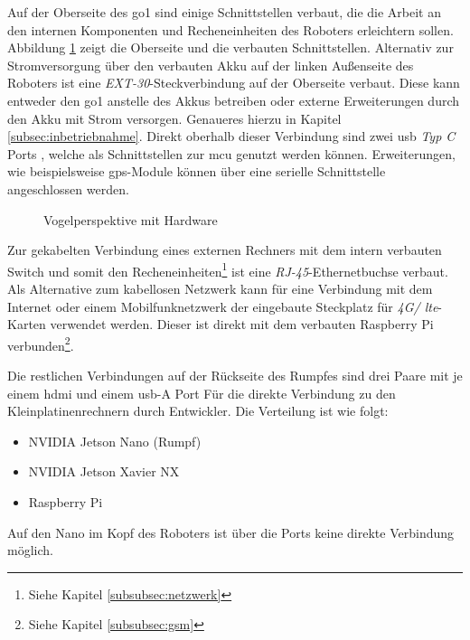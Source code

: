 Auf der Oberseite des \gls{go1} sind einige Schnittstellen verbaut, die die Arbeit an den internen Komponenten und
Recheneinheiten des Roboters erleichtern sollen.
Abbildung \ref{fig:vogelperspektive} zeigt die Oberseite und die verbauten Schnittstellen.
Alternativ zur Stromversorgung über den verbauten Akku  auf der linken Außenseite des Roboters ist eine
\emph{EXT-30}-Steckverbindung  auf der Oberseite verbaut.
Diese kann entweder den \gls{go1} anstelle des Akkus betreiben oder externe Erweiterungen durch den Akku mit Strom versorgen.
Genaueres hierzu in Kapitel \ref{subsec:inbetriebnahme}.
Direkt oberhalb dieser Verbindung sind zwei \gls{usb} \emph{Typ C} Ports , welche als Schnittstellen zur \gls{mcu} genutzt werden können.
Erweiterungen, wie beispielsweise \gls{gps}-Module können über eine serielle Schnittstelle  angeschlossen werden.

\begin{figure}[h]
    \caption{Vogelperspektive mit Hardware}\label{fig:vogelperspektive}
\end{figure}

Zur gekabelten Verbindung eines externen Rechners mit dem intern verbauten Switch und somit den Recheneinheiten\footnote{Siehe Kapitel \ref{subsubsec:netzwerk}}
ist eine \emph{RJ-45}-Ethernetbuchse  verbaut.
Als Alternative zum kabellosen Netzwerk kann für eine Verbindung mit dem Internet oder einem Mobilfunknetzwerk der eingebaute
Steckplatz für \emph{4G/ \gls{lte}}-Karten  verwendet werden.
Dieser ist direkt mit dem verbauten Raspberry Pi verbunden\footnote{Siehe Kapitel \ref{subsubsec:gsm}}.

Die restlichen Verbindungen auf der Rückseite des Rumpfes sind drei Paare mit je einem \gls{hdmi} und einem \gls{usb}-A Port
Für die direkte Verbindung zu den Kleinplatinenrechnern durch Entwickler.
Die Verteilung ist wie folgt:

\begin{itemize}
    \item {} NVIDIA Jetson Nano (Rumpf)
    \item {} NVIDIA Jetson Xavier NX
    \item {} Raspberry Pi
\end{itemize}

Auf den Nano im Kopf des Roboters ist über die Ports keine direkte Verbindung möglich.




